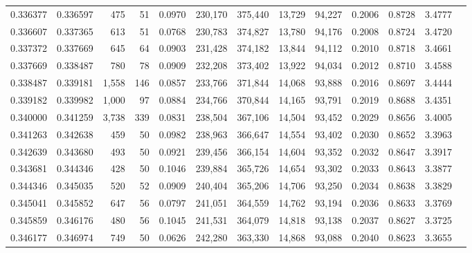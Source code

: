\begin{tabular}{rrrrrrrrrrrrr}
0.336377 & 0.336597 &   475 &  51 &                                     0.0970 & 230,170 & 375,440 &  13,729 &  94,227 & 0.2006 & 0.8728 & 3.4777 \\
0.336607 & 0.337365 &   613 &  51 &                                     0.0768 & 230,783 & 374,827 &  13,780 &  94,176 & 0.2008 & 0.8724 & 3.4720 \\
0.337372 & 0.337669 &   645 &  64 &                                     0.0903 & 231,428 & 374,182 &  13,844 &  94,112 & 0.2010 & 0.8718 & 3.4661 \\
0.337669 & 0.338487 &   780 &  78 &                                     0.0909 & 232,208 & 373,402 &  13,922 &  94,034 & 0.2012 & 0.8710 & 3.4588 \\
0.338487 & 0.339181 & 1,558 & 146 &                                     0.0857 & 233,766 & 371,844 &  14,068 &  93,888 & 0.2016 & 0.8697 & 3.4444 \\
0.339182 & 0.339982 & 1,000 &  97 &                                     0.0884 & 234,766 & 370,844 &  14,165 &  93,791 & 0.2019 & 0.8688 & 3.4351 \\
0.340000 & 0.341259 & 3,738 & 339 &                                     0.0831 & 238,504 & 367,106 &  14,504 &  93,452 & 0.2029 & 0.8656 & 3.4005 \\
0.341263 & 0.342638 &   459 &  50 &                                     0.0982 & 238,963 & 366,647 &  14,554 &  93,402 & 0.2030 & 0.8652 & 3.3963 \\
0.342639 & 0.343680 &   493 &  50 &                                     0.0921 & 239,456 & 366,154 &  14,604 &  93,352 & 0.2032 & 0.8647 & 3.3917 \\
0.343681 & 0.344346 &   428 &  50 &                                     0.1046 & 239,884 & 365,726 &  14,654 &  93,302 & 0.2033 & 0.8643 & 3.3877 \\
0.344346 & 0.345035 &   520 &  52 &                                     0.0909 & 240,404 & 365,206 &  14,706 &  93,250 & 0.2034 & 0.8638 & 3.3829 \\
0.345041 & 0.345852 &   647 &  56 &                                     0.0797 & 241,051 & 364,559 &  14,762 &  93,194 & 0.2036 & 0.8633 & 3.3769 \\
0.345859 & 0.346176 &   480 &  56 &                                     0.1045 & 241,531 & 364,079 &  14,818 &  93,138 & 0.2037 & 0.8627 & 3.3725 \\
0.346177 & 0.346974 &   749 &  50 &                                     0.0626 & 242,280 & 363,330 &  14,868 &  93,088 & 0.2040 & 0.8623 & 3.3655 \\

\end{tabular}
